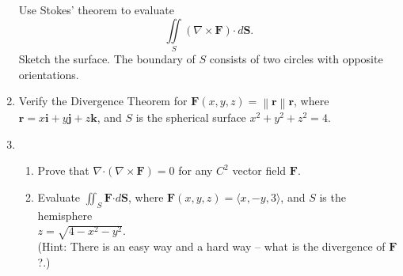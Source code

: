 \documentclass[12pt]{article}
\newcommand{\points}[1]{\marginpar{\hspace{24pt}[#1]}}
\newcommand{\di}{\displaystyle}
\newcommand{\dotp}{\boldsymbol{\cdot}}
\newcommand{\F}{\mathbf{F}}
\renewcommand{\i}{\mathbf{i}}
\renewcommand{\j}{\mathbf{j}}
\renewcommand{\k}{\mathbf{k}}
\renewcommand{\S}{\mathbf{S}}
\renewcommand{\r}{\mathbf{r}}
\newcommand{\len}[1]{\left\lVert #1\right\rVert}
\begin{document}
\begin{enumerate}
Use Stokes' theorem to evaluate 
\begin{equation*}
\iint\limits_S\left(\nabla\times\F\right)\dotp\,d\S.
\end{equation*}
 Sketch the surface. The boundary of $S$ consists of two circles with opposite orientations.


\newpage


\item Verify the Divergence Theorem for $\F(x,y,z) = \len{\r}\r$, where $\r = x\i + y\j + z\k$, and $S$ is the spherical surface $x^2+y^2+z^2 = 4$.\points{10}


\newpage


\item \begin{enumerate}
\item Prove that $\nabla\dotp (\nabla\times \F) = 0$ for any $C^2$ vector field $\F$.\points{4}

\vspace{3.5in}


\item Evaluate $\di \iint_S \F\dotp d\S$, where $\F(x,y,z) = \langle x, -y, 3\rangle$, and $S$ is the hemisphere\\ $z=\sqrt{4-x^2-y^2}$. \points{6} \\(Hint: There is an easy way and a hard way -- what is the divergence of $\F$?.)
\end{enumerate}

\end{enumerate}
\newpage
\end{document}
